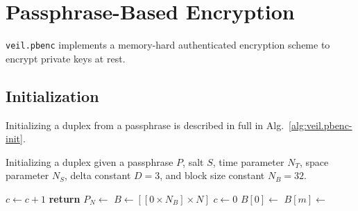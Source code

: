 \section{Passphrase-Based Encryption}\label{sec:veil.pbenc}

\texttt{veil.pbenc} implements a memory-hard authenticated encryption scheme to encrypt private keys at rest.

\subsection{Initialization}\label{subsec:veil.pbenc-init}

Initializing a duplex from a passphrase is described in full in Alg.~\ref{alg:veil.pbenc-init}\@.

\begin{algorithm}[ht]
    \caption{
        Initializing a duplex given a passphrase $P$, salt $S$, time parameter $N_T$, space parameter $N_S$, delta
        constant $D = 3$, and block size constant $N_B = 32$.
    }
    \begin{algorithmic}
            \State $c \gets c + 1$
            \State {}
            \State {}
            \State {}
            \State \textbf{return} 
        \EndFunction
            \State {}
            \State $P_N \gets$
            \State {}
            \State {}
            \State {}
            \State {}
            \State {}
            \State {}
            \State
            \State $B \gets [[0 \times N_B] \times N]$
            \State $c \gets 0$
            \State
            \State $B[0] \gets $
                \State $B[m] \gets $
            \EndFor
            \State


\end{algorithmic}
\end{algorithm}
